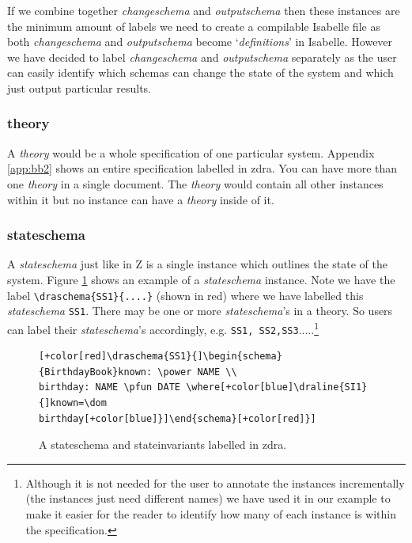 If we combine together \emph{changeschema} and \emph{outputschema} then these
instances are the minimum amount of labels we need to create a compilable
Isabelle file as both \emph{changeschema} and \emph{outputschema} become
`\emph{definitions}' in Isabelle. However we have decided to label
\emph{changeschema} and \emph{outputschema} separately as the user can easily
identify which schemas can change the state of the system and which just output
particular results.

\subsubsection{theory}

A \emph{theory} would be a whole specification of one particular system.
Appendix \ref{app:bb2} shows an entire specification labelled in \gls{zdra}. You can have
more than one \emph{theory} in a single document. The \emph{theory} would
contain all other instances within it but no instance can have a \emph{theory}
inside of it.

\subsubsection{stateschema}

A \emph{stateschema} just like in Z is a single instance which outlines the
state of the system. Figure \ref{fig:exampleofss} shows an example of a
\emph{stateschema} instance. Note we have the label \verb|\draschema{SS1}{....}|
(shown in red) where we have labelled this \emph{stateschema} \verb|SS1|. There
may be one or more \emph{stateschema}'s in a theory. So users can label their
\emph{stateschema}'s accordingly, e.g.
\verb|SS1, SS2,SS3|.....\footnote{Although it is not needed for the user to annotate the
instances incrementally (the instances just need different names) we have used
it in our example to make it easier for the reader to identify how many of each instance is within the specification.}

\begin{figure}[H]
\centering
\begin{footnotesize}
\begin{BVerbatim}[commandchars=+\[\]]
[+color[red]\draschema{SS1}{]\begin{schema}{BirthdayBook}known: \power NAME \\
birthday: NAME \pfun DATE \where[+color[blue]\draline{SI1}{]known=\dom
birthday[+color[blue]}]\end{schema}[+color[red]}]
\end{BVerbatim}
\end{footnotesize}
\caption{\label{fig:exampleofss} A stateschema and stateinvariants labelled in \gls{zdra}.}
\end{figure}

